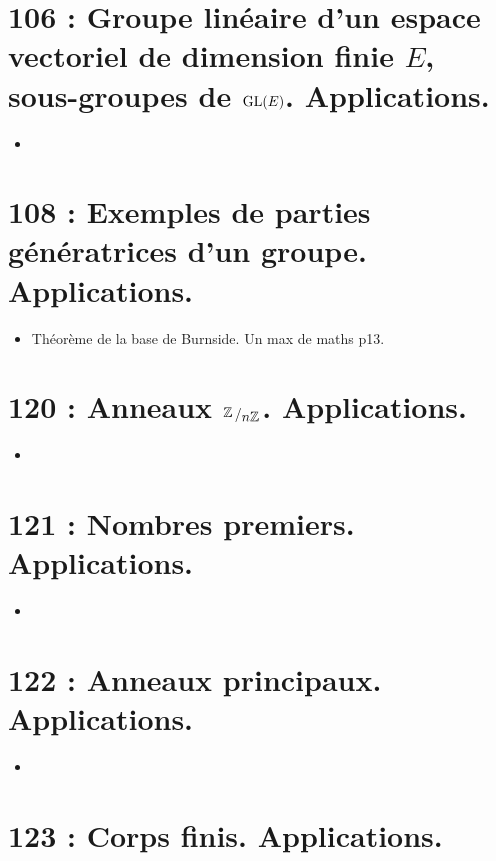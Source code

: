 \documentclass[a4paper,10pt,oneside,twocolumn,landscape]{book}
\begin{document}
\section{106 : Groupe linéaire d’un espace vectoriel de dimension finie $E$, sous-groupes de $\textup{GL}(E)$. Applications.}
\begin{itemize}
	\item
\end{itemize}


\section{108 :  Exemples de parties génératrices d’un groupe. Applications.}

\begin{itemize}
	\item Théorème de la base de Burnside. Un max de maths p13.
\end{itemize}


\section{120 : Anneaux $\bigslant{\bZ}{n\bZ}$. Applications.}

\begin{itemize}
	\item 
\end{itemize}

\section{121 : Nombres premiers. Applications.}

\begin{itemize}
	\item 
\end{itemize}

\section{122 : Anneaux principaux. Applications.}

\begin{itemize}
	\item 
\end{itemize}

\section{123 : Corps finis. Applications.}
\end{document}
